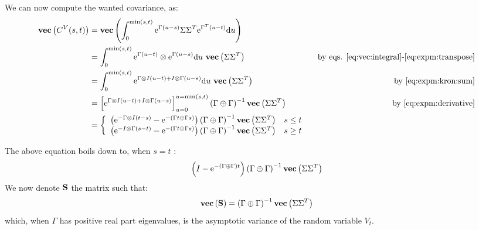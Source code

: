 We can now compute the wanted covariance, as:
\begin{align*}
\textbf{vec}\left(C^V(s,t) \right) &= \textbf{vec}\left(\int_0^{\min(s, t)} \text{e}^{\Gamma (u-s)} \Sigma\Sigma^T \text{e}^{\Gamma^T (u-t)} \text{d} u \right) & \\
&=\int_0^{\min(s, t)} \text{e}^{\Gamma (u-t)} \otimes \text{e}^{\Gamma (u-s)}  \text{d} u~ \textbf{vec}\left(\Sigma\Sigma^T \right)& \text{ by eqs. \eqref{eq:vec:integral}-\eqref{eq:expm:transpose}}\\
&= \int_0^{\min(s, t)} \text{e}^{\Gamma \otimes I (u-t) + I \otimes \Gamma (u -s)}\text{d} u~ \textbf{vec}\left(\Sigma\Sigma^T \right)  & \text{ by \eqref{eq:expm:kron:sum}} \\
&= \left[ \text{e}^{\Gamma \otimes I (u-t) + I \otimes \Gamma (u -s)} \right]_{u=0}^{u = \min(s, t)} \left( \Gamma \oplus \Gamma \right)^{-1}  \textbf{vec}\left(\Sigma \Sigma^T \right)  & \text{ by \eqref{eq:expm:derivative}}  \\
&= \left\lbrace \begin{array}{lr}
 \left( \text{e}^{- \Gamma \otimes I (t - s)} - \text{e}^{-(\Gamma t \oplus \Gamma s)} \right) \left( \Gamma \oplus \Gamma \right)^{-1} \textbf{vec}\left(\Sigma \Sigma^T \right) & s \leq t \\
 \left(\text{e}^{- I \otimes \Gamma (s - t)} - \text{e}^{-(\Gamma t \oplus \Gamma s)} \right) \left( \Gamma \oplus \Gamma \right)^{-1} \textbf{vec}\left(\Sigma \Sigma^T \right) & s \geq t
\end{array}\right. &
\end{align*}


The above equation boils down to,  when $s=t$ :
$$\left(I - \text{e}^{-(\Gamma  \oplus \Gamma) t} \right) \left( \Gamma \oplus \Gamma \right)^{-1}\textbf{vec}\left(\Sigma \Sigma^T \right) $$
We now denote $\mathbf{S}$ the matrix such that:
\begin{equation}
\textbf{vec}\left(\mathbf{S} \right) = \left( \Gamma \oplus \Gamma \right)^{-1}\textbf{vec}\left(\Sigma \Sigma^T \right) \label{eq:S:matrix}
\end{equation}
which, when $\Gamma$ has positive real part eigenvalues, is the asymptotic variance of the random variable $V_t$.

